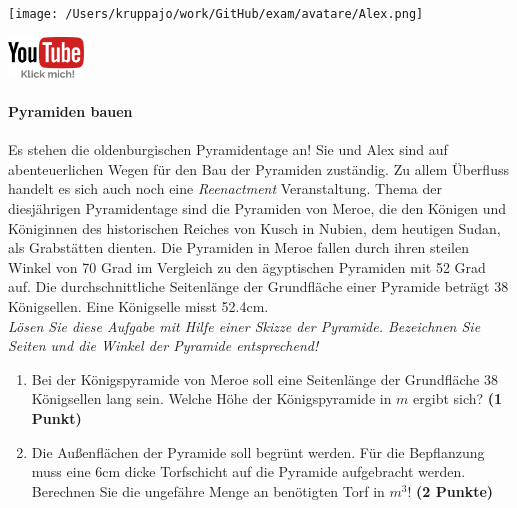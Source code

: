 \documentclass[a4paper, 9pt]{scrartcl}\usepackage[]{graphicx}\usepackage[]{xcolor}
\begin{document}
 
\ifcollection
\begin{flushright}
\tiny\vspace{-3Ex}
\textbf{\examinhaltstart}
\exammodulemathstat
\vspace{-4Ex}
\end{flushright}
\begin{minipage}[t]{0.5\textwidth}
\texttt{[image: /Users/kruppajo/work/GitHub/exam/avatare/Alex.png]}
\end{minipage}
\begin{minipage}[t]{0.5\textwidth}
\hfill
\href{https://youtu.be/tDgr6fpkkYA}{\includegraphics[width = 2cm]{img/youtube}}
\end{minipage}
\fi



\ifcollection
\paragraph{Pyramiden bauen}
\fi



Es stehen die oldenburgischen Pyramidentage an! Sie und Alex sind auf abenteuerlichen Wegen für den Bau der Pyramiden zuständig. Zu allem Überfluss handelt es sich auch noch eine \textit{Reenactment} Veranstaltung. Thema der diesjährigen Pyramidentage sind die Pyramiden von Meroe, die den Königen und Königinnen des historischen Reiches von Kusch in Nubien, dem heutigen Sudan, als Grabstätten dienten. Die Pyramiden in Meroe fallen durch ihren steilen Winkel von 70 Grad im Vergleich zu den ägyptischen Pyramiden mit 52 Grad auf. Die durchschnittliche Seitenlänge der Grundfläche einer Pyramide beträgt 38 Königsellen. Eine Königselle misst 52.4cm.\\

\textit{Lösen Sie diese Aufgabe mit Hilfe einer Skizze der Pyramide. Bezeichnen Sie Seiten und die Winkel der Pyramide entsprechend!}

\begin{enumerate}
\item Bei der Königspyramide von Meroe soll eine Seitenlänge der Grundfläche 38 Königsellen lang sein. Welche Höhe der Königspyramide in $m$ ergibt sich? \textbf{(1 Punkt)}
\item Die Außenflächen der Pyramide soll begrünt werden. Für die Bepflanzung muss eine 6cm dicke Torfschicht auf die Pyramide aufgebracht werden. Berechnen Sie die ungefähre Menge an benötigten Torf in $m^3$! \textbf{(2 Punkte)}
\end{enumerate}
\end{document}
